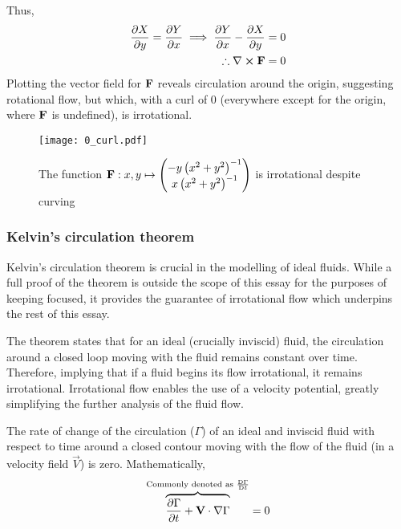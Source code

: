 Thus,
\begin{align*}
    \pdv{X}{y}=\pdv{Y}{x}\implies\pdv{Y}{x}-\pdv{X}{y}=0\\
    \therefore\curl{\fatf}=0
\end{align*}
Plotting the vector field for $\mathbf{F}$ reveals circulation around the origin, suggesting rotational flow, but which, with a curl of 0 (everywhere except for
the origin, where $\mathbf{F}$ is undefined), is irrotational.
\begin{figure*}[!ht]
    \texttt{[image: 0\_curl.pdf]}
    \centering
    \caption{The function $\mathbf{F}:x,y\mapsto\begin{pmatrix}
        -y\left(x^2+y^2\right)^{-1}\\x\left(x^2+y^2\right)^{-1}
    \end{pmatrix}$ is irrotational despite curving}
    \label{figure:ZEROCURL}
\end{figure*}

\subsubsection{Kelvin's circulation theorem}\label{section:KELVIN}
Kelvin's circulation theorem is crucial in the modelling of ideal fluids. While a full proof of the theorem is outside the scope of this essay for the purposes
of keeping focused, it provides the guarantee of irrotational flow which underpins the rest of this essay.

The theorem states that for an ideal (crucially inviscid) fluid, the circulation around a closed loop moving with the fluid remains constant over time. Therefore,
implying that if a fluid begins its flow irrotational, it remains irrotational. Irrotational flow enables the use of a velocity potential,
greatly simplifying the further analysis of the fluid flow.
\begin{theorem}\label{lemma:KELVIN}
    The rate of change of the circulation ($\Gamma$) of an ideal and inviscid fluid with respect to time around a closed contour moving with the flow of the fluid (in a
    velocity field $\vec{V}$) is zero. Mathematically,
    $$
        \overbrace{\pdv{\Gamma}{t}+\mathbf{V}\cdot\nabla\Gamma}^{\text{Commonly denoted as }\frac{\mathrm{D} \Gamma}{\mathrm{D} t}}=0
    $$
\end{theorem}

\newpage %
